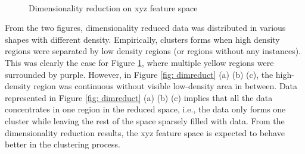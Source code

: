 \documentclass[a4paper]{article}
\begin{document}
\begin{figure}[H]
    \centering
     \\
    \caption{Dimensionality reduction on xyz feature space}
    \label{fig: dimreduct_xyz}
\end{figure}

From the two figures, dimensionality reduced data was distributed in various shapes with different density. Empirically, clusters forms when high density regions were separated by low density regions (or regions without any instances). This was clearly the case for Figure \ref{fig: dimreduct_xyz}, where multiple yellow regions were surrounded by purple. However, in Figure \ref{fig: dimreduct} (a) (b) (c), the high-density region was continuous without visible low-density area in between. Data represented in Figure \ref{fig: dimreduct} (a) (b) (c) implies that all the data concentrates in one region in the reduced space, i.e., the data only forms one cluster while leaving the rest of the space sparsely filled with data. From the dimensionality reduction results, the xyz feature space is expected to behave better in the clustering process.
\end{document}
